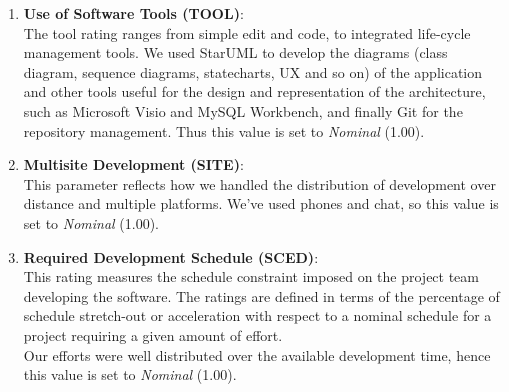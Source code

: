 \documentclass[\mainpath/main]{subfiles}
\begin{document}
\begin{enumerate}
	\item \textbf{Use of Software Tools (TOOL)}:\\
	The tool rating ranges from simple edit and code, to
	integrated life-cycle management tools. We used StarUML to develop the diagrams (class diagram, sequence diagrams, statecharts, UX and so on) of the application and other tools useful for the design and representation of the architecture, such as Microsoft Visio and MySQL Workbench, and finally Git for the repository management. Thus this value is set to \textit{Nominal} (1.00).
	
	\item \textbf{Multisite Development (SITE)}:\\
	This parameter reflects how we handled the distribution of development over distance and multiple platforms. We've used phones and chat, so this value is set to \textit{Nominal} (1.00).
	
	\item \textbf{Required Development Schedule (SCED)}:\\
	This rating measures the schedule constraint imposed on the project team developing the	software. The ratings are defined in terms of the percentage of schedule stretch-out or acceleration with respect to a nominal schedule for a project requiring a given amount of effort.\\
	Our efforts were well distributed over the available development time, hence this value is set to \textit{Nominal} (1.00).
	\\
	
\end{enumerate}

\clearpage
\end{document}
